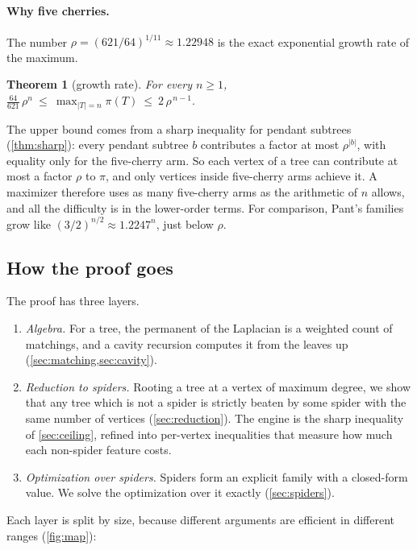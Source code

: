 \documentclass[11pt]{article}
\newtheorem{theorem}{Theorem}
\theoremstyle{definition}
\begin{document}
\paragraph{Why five cherries.} The number $\rho=(621/64)^{1/11}\approx1.22948$ is the exact exponential
growth rate of the maximum.

\begin{theorem}[growth rate]\label{thm:growth}
For every $n\ge1$,
$\displaystyle \frac{64}{621}\,\rho^{n}\ \le\ \max_{|T|=n}\pi(T)\ \le\ 2\,\rho^{\,n-1}.$
\end{theorem}

The upper bound comes from a sharp inequality for pendant subtrees (\cref{thm:sharp}): every pendant
subtree $b$ contributes a factor at most $\rho^{|b|}$, with equality only for the five-cherry arm. So
each vertex of a tree can contribute at most a factor $\rho$ to $\pi$, and only vertices inside
five-cherry arms achieve it. A maximizer therefore uses as many five-cherry arms as the arithmetic of $n$
allows, and all the difficulty is in the lower-order terms. For comparison, Pant's families grow like
$(3/2)^{n/2}\approx1.2247^{n}$, just below $\rho$.

\subsection{How the proof goes}

The proof has three layers.

\begin{enumerate}[label=(\alph*)]
\item \emph{Algebra.} For a tree, the permanent of the Laplacian is a weighted count of matchings, and
  a cavity recursion computes it from the leaves up (\cref{sec:matching,sec:cavity}).
\item \emph{Reduction to spiders.} Rooting a tree at a vertex of maximum degree, we show that any tree
  which is not a spider is strictly beaten by some spider with the same number of vertices
  (\cref{sec:reduction}). The engine is the sharp inequality of \cref{sec:ceiling}, refined into per-vertex
  inequalities that measure how much each non-spider feature costs.
\item \emph{Optimization over spiders.} Spiders form an explicit family with a closed-form value. We
  solve the optimization over it exactly (\cref{sec:spiders}).
\end{enumerate}

Each layer is split by size, because different arguments are efficient in different ranges
(\cref{fig:map}):
\end{document}
